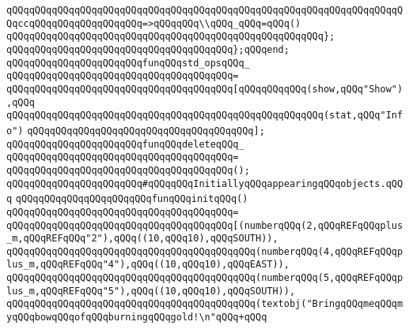 \verb|qQQqqQQqqQQqqQQqqQQqqQQqqQQqqQQqqQQqqQQqqQQqqQQqqQQqqQQqqQQqqQQqqQQqqQQqccqQQqqQQqqQQqqQQqqQQq=>qQQqqQQq\\qQQq_qQQq=qQQq()|\newline
\verb|qQQqqQQqqQQqqQQqqQQqqQQqqQQqqQQqqQQqqQQqqQQqqQQqqQQqqQQq};|\newline
\verb|qQQqqQQqqQQqqQQqqQQqqQQqqQQqqQQqqQQqqQQq};qQQqend;|\newline
\newline
\newline
\verb|qQQqqQQqqQQqqQQqqQQqqQQqfunqQQqstd_opsqQQq_|\newline
\verb|qQQqqQQqqQQqqQQqqQQqqQQqqQQqqQQqqQQqqQQq=|\newline
\verb|qQQqqQQqqQQqqQQqqQQqqQQqqQQqqQQqqQQqqQQq[qQQqqQQqqQQq(show,qQQq"Show"),qQQq|\newline
\verb|qQQqqQQqqQQqqQQqqQQqqQQqqQQqqQQqqQQqqQQqqQQqqQQqqQQqqQQq(stat,qQQq"Info")|\newline
\verb|qQQqqQQqqQQqqQQqqQQqqQQqqQQqqQQqqQQqqQQq];|\newline
\newline
\newline
\verb|qQQqqQQqqQQqqQQqqQQqqQQqfunqQQqdeleteqQQq_|\newline
\verb|qQQqqQQqqQQqqQQqqQQqqQQqqQQqqQQqqQQqqQQq=|\newline
\verb|qQQqqQQqqQQqqQQqqQQqqQQqqQQqqQQqqQQqqQQq();|\newline
\newline
\newline
\verb|qQQqqQQqqQQqqQQqqQQqqQQq#qQQqqQQqInitiallyqQQqappearingqQQqobjects.qQQq|\newline
\newline
\verb|qQQqqQQqqQQqqQQqqQQqqQQqfunqQQqinitqQQq()|\newline
\verb|qQQqqQQqqQQqqQQqqQQqqQQqqQQqqQQqqQQqqQQq=|\newline
\verb|qQQqqQQqqQQqqQQqqQQqqQQqqQQqqQQqqQQqqQQq[(numberqQQq(2,qQQqREFqQQqplus_m,qQQqREFqQQq"2"),qQQq((10,qQQq10),qQQqSOUTH)),|\newline
\verb|qQQqqQQqqQQqqQQqqQQqqQQqqQQqqQQqqQQqqQQqqQQq(numberqQQq(4,qQQqREFqQQqplus_m,qQQqREFqQQq"4"),qQQq((10,qQQq10),qQQqEAST)),|\newline
\verb|qQQqqQQqqQQqqQQqqQQqqQQqqQQqqQQqqQQqqQQqqQQq(numberqQQq(5,qQQqREFqQQqplus_m,qQQqREFqQQq"5"),qQQq((10,qQQq10),qQQqSOUTH)),|\newline
\verb|qQQqqQQqqQQqqQQqqQQqqQQqqQQqqQQqqQQqqQQqqQQq(textobj("BringqQQqmeqQQqmyqQQqbowqQQqofqQQqburningqQQqgold!\n"qQQq+qQQq|\newline

